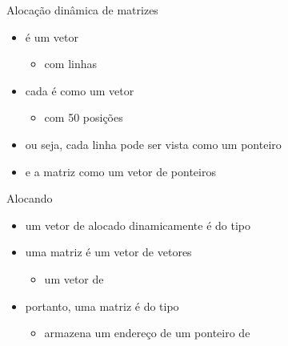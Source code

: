 \documentclass{beamer}
\begin{document}
\begin{frame}[<+->]{Alocação dinâmica de matrizes}
  \begin{itemize}
    \item {} é um vetor
      \begin{itemize}
        \item com  linhas
      \end{itemize}
    \item cada  é como um vetor
      \begin{itemize}
        \item com 50 posições
      \end{itemize}
  \end{itemize}

  \bigskip

  \begin{itemize}
    \item ou seja, cada linha pode ser vista como um ponteiro
    \item e a matriz como um vetor de ponteiros
  \end{itemize}

  \bigskip

\end{frame}

\begin{frame}[<+->]{Alocando}
  \begin{itemize}
    \item um vetor de  alocado dinamicamente é do tipo 
    \item uma matriz é um vetor de vetores
      \begin{itemize}
        \item um vetor de 
      \end{itemize}
    \item portanto, uma matriz é do tipo 
      \begin{itemize}
        \item armazena um endereço de um ponteiro de 
      \end{itemize}
  \end{itemize}

  \action{}
\end{frame}
\end{document}
